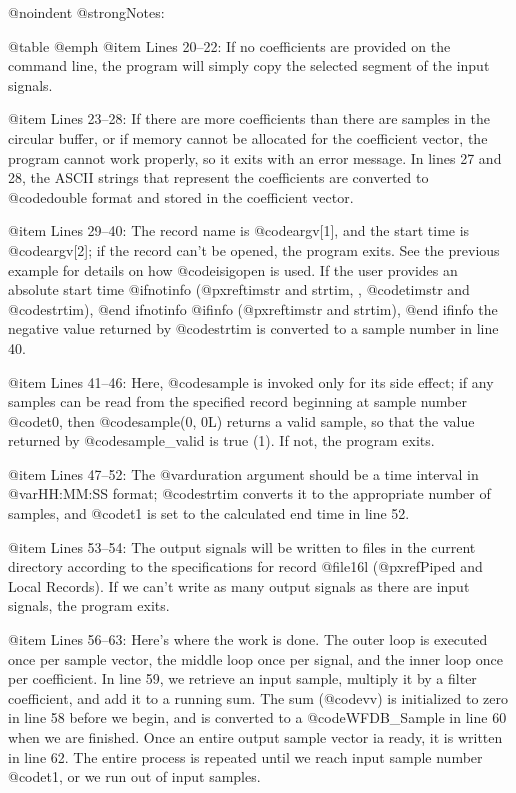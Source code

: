 {{{{{{{{{@noindent
@strong{Notes:}

@table @emph
@item Lines 20--22:
If no coefficients are provided on the command line, the program will
simply copy the selected segment of the input signals.

@item Lines 23--28:
If there are more coefficients than there are samples in the circular
buffer, or if memory cannot be allocated for the coefficient vector, the
program cannot work properly, so it exits with an error message.  In
lines 27 and 28, the ASCII strings that represent the coefficients are
converted to @code{double} format and stored in the coefficient
vector.

@item Lines 29--40:
The record name is @code{argv[1]}, and the start time is @code{argv[2]};
if the record can't be opened, the program exits.  See the previous example
for details on how @code{isigopen} is used. If the user provides an absolute
start time
@ifnotinfo
(@pxref{timstr and strtim, , @code{timstr} and @code{strtim}}),
@end ifnotinfo
@ifinfo
(@pxref{timstr and strtim}),
@end ifinfo
the negative value returned by @code{strtim} is converted to a sample number
in line 40.

@item Lines 41--46:
Here, @code{sample} is invoked only for its side effect;  if any samples can
be read from the specified record beginning at sample number @code{t0}, then
@code{sample(0, 0L)} returns a valid sample, so that the value returned by
@code{sample_valid} is true (1).  If not, the program exits.

@item Lines 47--52:
The @var{duration} argument should be a time interval in @var{HH:MM:SS}
format; @code{strtim} converts it to the appropriate number of
samples, and @code{t1} is set to the calculated end time in line 52.

@item Lines 53--54:
The output signals will be written to files in the current directory
according to the specifications for record @file{16l}
(@pxref{Piped and Local Records}).  If we can't write as many output
signals as there are input signals, the program exits.

@item Lines 56--63:
Here's where the work is done.  The outer loop is executed once per
sample vector, the middle loop once per signal, and the inner loop
once per coefficient.  In line 59, we retrieve an input sample,
multiply it by a filter coefficient, and add it to a running sum.
The sum (@code{vv}) is initialized to zero in line 58 before we begin, and is
converted to a @code{WFDB_Sample} in line 60 when we are finished.  Once
an entire output sample vector ia ready, it is written in line 62.
The entire process is repeated until we reach input sample number @code{t1},
or we run out of input samples.

}}}}}}}}}
